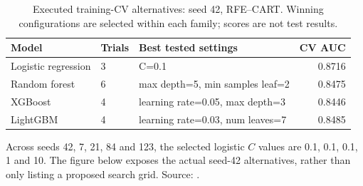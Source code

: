 \begin{table}[H]
\centering\small
\caption{Executed training-CV alternatives: seed 42, RFE--CART. Winning configurations are selected within each family; scores are not test results.}
\begin{tabular}{lp{0.8cm}p{6.5cm}r}
\toprule
Model & Trials & Best tested settings & CV AUC \\
\midrule
Logistic regression & 3 & C=0.1 & 0.8716 \\
Random forest & 6 & max depth=5, min samples leaf=2 & 0.8475 \\
XGBoost & 4 & learning rate=0.05, max depth=3 & 0.8446 \\
LightGBM & 4 & learning rate=0.03, num leaves=7 & 0.8485 \\
\bottomrule
\end{tabular}
\end{table}

Across seeds 42, 7, 21, 84 and 123, the selected logistic $C$ values are 0.1, 0.1, 0.1, 1 and 10. The figure below exposes the actual seed-42 alternatives, rather than only listing a proposed search grid. Source: .
